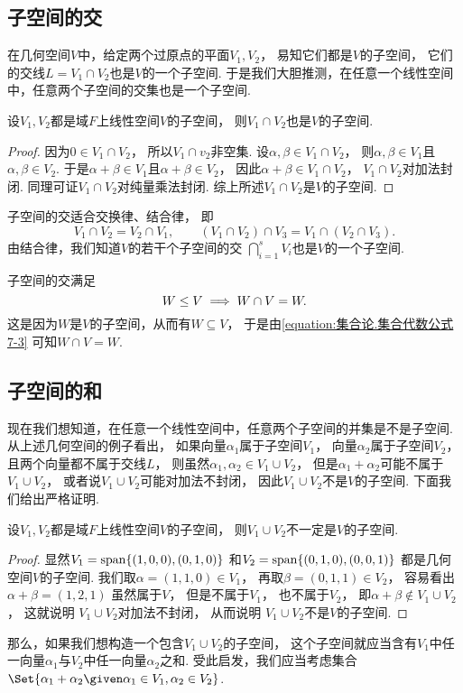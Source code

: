 \subsection{子空间的交}
在几何空间\(V\)中，给定两个过原点的平面\(V_1,V_2\)，
易知它们都是\(V\)的子空间，
它们的交线\(L = V_1 \cap V_2\)也是\(V\)的一个子空间.
于是我们大胆推测，在任意一个线性空间中，任意两个子空间的交集也是一个子空间.
\begin{theorem}
设\(V_1,V_2\)都是域\(F\)上线性空间\(V\)的子空间，
则\(V_1 \cap V_2\)也是\(V\)的子空间.
\begin{proof}
因为\(0\in V_1 \cap V_2\)，
所以\(V_1 \cap v_2\)非空集.
设\(\alpha,\beta\in V_1 \cap V_2\)，
则\(\alpha,\beta\in V_1\)且\(\alpha,\beta\in V_2\).
于是\(\alpha+\beta\in V_1\)且\(\alpha+\beta\in V_2\)，
因此\(\alpha+\beta\in V_1 \cap V_2\)，
\(V_1 \cap V_2\)对加法封闭.
同理可证\(V_1 \cap V_2\)对纯量乘法封闭.
综上所述\(V_1 \cap V_2\)是\(V\)的子空间.
\end{proof}
\end{theorem}

子空间的交适合交换律、结合律，
即\[
	V_1 \cap V_2
	=V_2 \cap V_1, \qquad
	(V_1 \cap V_2) \cap V_3
	=V_1 \cap (V_2 \cap V_3).
\]
由结合律，我们知道\(V\)的若干个子空间的交
\(\bigcap_{i=1}^s V_i\)也是\(V\)的一个子空间.

子空间的交满足\[
	W \leq V
	\implies
	W \cap V = W.
\]
这是因为\(W\)是\(V\)的子空间，从而有\(W \subseteq V\)，
于是由\cref{equation:集合论.集合代数公式7-3} 可知\(W \cap V = W\).

\subsection{子空间的和}
现在我们想知道，在任意一个线性空间中，任意两个子空间的并集是不是子空间.
从上述几何空间的例子看出，
如果向量\(\alpha_1\)属于子空间\(V_1\)，
向量\(\alpha_2\)属于子空间\(V_2\)，
且两个向量都不属于交线\(L\)，
则虽然\(\alpha_1,\alpha_2 \in V_1 \cup V_2\)，
但是\(\alpha_1 + \alpha_2\)可能不属于\(V_1 \cup V_2\)，
或者说\(V_1 \cup V_2\)可能对加法不封闭，
因此\(V_1 \cup V_2\)不是\(V\)的子空间.
下面我们给出严格证明.
\begin{proposition}
设\(V_1,V_2\)都是域\(F\)上线性空间\(V\)的子空间，
则\(V_1 \cup V_2\)不一定是\(V\)的子空间.
\begin{proof}
显然\(V_1=\operatorname{span}\{(1,0,0),(0,1,0)\}\)
和\(V_2=\operatorname{span}\{(0,1,0),(0,0,1)\}\)
都是几何空间\(V\)的子空间.
我们取\(\alpha=(1,1,0)\in V_1\)，
再取\(\beta=(0,1,1)\in V_2\)，
容易看出\(\alpha+\beta=(1,2,1)\)
虽然属于\(V\)，
但是不属于\(V_1\)，
也不属于\(V_2\)，
即\(\alpha+\beta\notin V_1 \cup V_2\)，
这就说明
\(V_1 \cup V_2\)对加法不封闭，
从而说明
\(V_1 \cup V_2\)不是\(V\)的子空间.
\end{proof}
\end{proposition}
那么，如果我们想构造一个包含\(V_1 \cup V_2\)的子空间，
这个子空间就应当含有\(V_1\)中任一向量\(\alpha_1\)与\(V_2\)中任一向量\(\alpha_2\)之和.
受此启发，我们应当考虑集合
\(\Set{ \alpha_1 + \alpha_2 \given \alpha_1 \in V_1,\alpha_2 \in V_2 }\).

